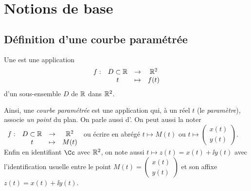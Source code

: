\documentclass[class=report,crop=false]{standalone}
\begin{document}


\section{Notions de base}

\subsection{Définition d'une courbe paramétrée}


\begin{definition}
Une  est une application
$$\begin{array}[t]{cccc}
f :&D\subset\mathbb{R}&\rightarrow&\mathbb{R}^2\\
 &t&\mapsto&f(t)
\end{array}$$ d'un sous-ensemble $D$ de $\mathbb{R}$ dans $\mathbb{R}^2$.
\end{definition}



Ainsi, une \emph{courbe paramétrée} est une application qui,
à un réel $t$ (le \emph{paramètre}), associe \emph{un point}
du plan. On parle aussi d'.
On peut aussi la noter
$\begin{array}[t]{cccc}
f :&D\subset\mathbb{R}&\rightarrow&\mathbb{R}^2\\
 &t&\mapsto&M(t)
\end{array}$ ou écrire en abrégé
$t\mapsto M(t)$ ou $t\mapsto\left(
\begin{smallmatrix}
x(t)\\
y(t)
\end{smallmatrix}
\right)$.
Enfin en identifiant $\Cc$ avec $\mathbb{R}^2$, on note aussi
$t\mapsto z(t)=x(t)+\ii y(t)$ avec l'identification
usuelle entre le point $M(t)=\left(\begin{smallmatrix}
x(t)\\
y(t)
\end{smallmatrix}
\right)$ et son affixe $z(t)=x(t)+\ii y(t)$.

\end{document}
